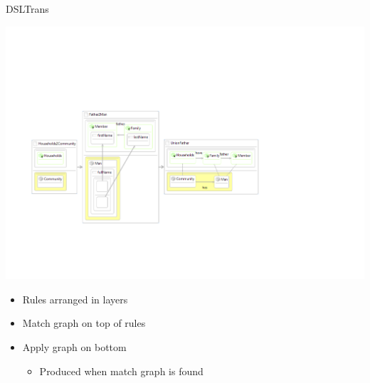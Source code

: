 \documentclass[xcolor=dvipsnames, 12pt, handout]{beamer}
\begin{document}
\begin{frame}{DSLTrans}
\begin{center}
\includegraphics[width=\textwidth]{figures/Rules}
\end{center}
\pause
\begin{itemize}[<+->]
\item Rules arranged in layers
\item Match graph on top of rules
\item Apply graph on bottom
\begin{itemize}
\item Produced when match graph is found
\end{itemize}
\end{itemize}
\end{frame}
\end{document}

